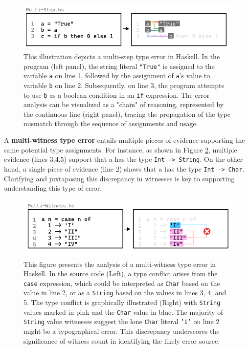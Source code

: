 \begin{figure}[]
  \includegraphics[width=\linewidth]{Multi-Step}
  \caption[This illustration depicts a multi-step type error in Haskell]{
    \label{fig:multi-step-example}
    This illustration depicts a multi-step type error in Haskell. In the program (left panel), the string literal \texttt{"True"} is assigned to the variable \texttt{a} on line 1, followed by the assignment of \texttt{a}'s value to variable \texttt{b} on line 2. Subsequently, on line 3, the program attempts to use \texttt{b} as a boolean condition in an \texttt{if} expression. The error analysis can be visualized as a "chain" of reasoning, represented by the continuous line (right panel), tracing the propagation of the type mismatch through the sequence of assignments and usage. }
\end{figure}

A \textbf{multi-witness type error} entails multiple pieces of evidence supporting the same potential type assignments. For instance, as shown in Figure \ref{fig:multi-witness-example}, multiple evidence (lines 3,4,5) support that a has the type \texttt{Int -> String}. On the other hand, a single piece of evidence (line 2) shows that a has the type \texttt{Int -> Char}.  Clarifying and juxtaposing this discrepancy in witnesses is key to supporting understanding this type of error.

\begin{figure}[]
  \includegraphics[width=\linewidth]{Multi-Witness}
  \caption[This illustration depicts a multi-witness type error in Haskell]{
    \label{fig:multi-witness-example}
    This figure presents the analysis of a multi-witness type error in Haskell. In the source code (Left), a type conflict arises from the \texttt{case} expression, which could be interpreted as \texttt{Char} based on the value in line 2, or as a \texttt{String} based on the values in lines 3, 4, and 5. The type conflict is graphically illustrated (Right) with \texttt{String} values marked in pink and the \texttt{Char} value in blue. The majority of \texttt{String} value witnesses suggest the lone \texttt{Char} literal \texttt{'I'} on line 2 might be a typographical error. This discrepancy underscores the significance of witness count in identifying the likely error source.}
\end{figure}

